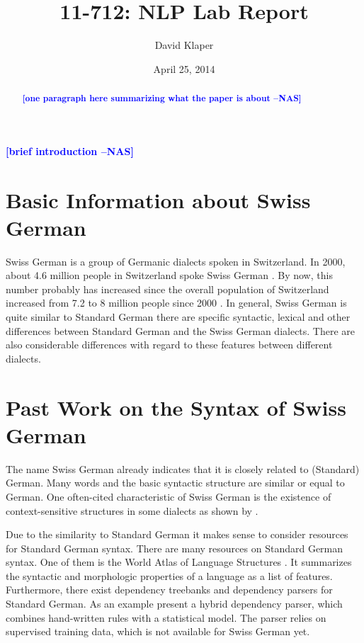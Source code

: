 \documentclass[11pt,letterpaper, covington]{article}
\title{11-712:  NLP Lab Report}
\author{David Klaper}
\date{April 25, 2014 \nascomment{due date}}
\newcommand{\nascomment}[1]{\textcolor{blue}{\textbf{[#1 --NAS]}}}
\begin{document}
\maketitle
\begin{abstract}
\nascomment{one paragraph here summarizing what the paper is about}
\end{abstract}

\nascomment{brief introduction}

\section{Basic Information about Swiss German}

Swiss German is a group of Germanic dialects spoken in Switzerland. In 2000, about 4.6 million people in Switzerland spoke Swiss German \citep{LGC13}. By now, this number probably has increased since the overall population of Switzerland increased from 7.2 to 8 million people since 2000 \citep{BFS13}. In general, Swiss German is quite similar to Standard German there are specific syntactic, lexical and other differences between Standard German and the Swiss German dialects. There are also considerable differences with regard to these features between different dialects. \citep{Scherrer11}

\section{Past Work on the Syntax of Swiss German}

The name Swiss German already indicates that it is closely related to (Standard) German. Many words and the basic syntactic structure are similar or equal to German. One often-cited characteristic of Swiss German is the existence of context-sensitive structures in some dialects as shown by \cite{Shieber85}.

Due to the similarity to Standard German it makes sense to consider resources for Standard German syntax. There are many resources on Standard German syntax. One of them is the World Atlas of Language Structures \citep{DH13}. It summarizes the syntactic and morphologic properties of a language as a list of features. Furthermore, there exist dependency treebanks and dependency parsers for Standard German. As an example \citet{SSVW09} present a hybrid dependency parser, which combines hand-written rules with a statistical model. The parser relies on supervised training data, which is not available for Swiss German yet.
\end{document}
